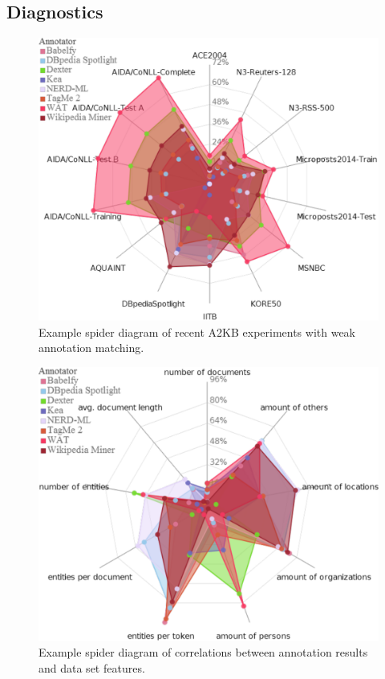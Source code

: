 \subsection{Diagnostics}
\begin{figure}[htb!]
\centering
\includegraphics[width=\linewidth]{part_02/benchmarking/WWW_GERBIL/results.pdf}
\caption{Example spider diagram of recent A2KB experiments with weak annotation matching.}
\label{cha333:fig:spiderfmeasure}
\end{figure}

\begin{figure}[htb!]
\centering
\includegraphics[width=\linewidth]{part_02/benchmarking/WWW_GERBIL/correlations.pdf}
\caption{Example spider diagram of correlations between annotation results and data set features.}
\label{cha333:fig:spidercorrelations}
\end{figure}

